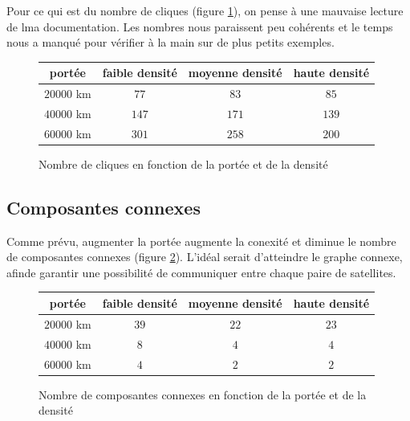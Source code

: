 \documentclass[french]{template}
\begin{document}
Pour ce qui est du nombre de cliques (figure \ref{tab:num-cliques}), on pense à une mauvaise lecture de lma documentation. Les nombres nous paraissent peu cohérents et le temps nous a manqué pour vérifier à la main sur de plus petits exemples.

\begin{figure}[ht]
    \centering
    \begin{tabular}{|c|c|c|c|}
        \hline
        portée      & faible densité & moyenne densité & haute densité \\
        \hline\hline
        $20 000$ km & $77$           & $83$            & $85$          \\
        \hline
        $40 000$ km & $147$          & $171$           & $139$         \\
        \hline
        $60 000$ km & $301$          & $258$           & $200$         \\
        \hline
    \end{tabular}
    \caption{Nombre de cliques en fonction de la portée et de la densité}
    \label{tab:num-cliques}
\end{figure}

\subsection{Composantes connexes}

Comme prévu, augmenter la portée augmente la conexité et diminue le nombre de composantes connexes (figure \ref{tab:num-connected-components}). L'idéal serait d'atteindre le graphe connexe, afinde garantir une possibilité de communiquer entre chaque paire de satellites.

\begin{figure}[ht]
    \centering
    \begin{tabular}{|c|c|c|c|}
        \hline
        portée      & faible densité & moyenne densité & haute densité \\
        \hline\hline
        $20 000$ km & $39$           & $22$            & $23$          \\
        \hline
        $40 000$ km & $8$            & $4$             & $4$           \\
        \hline
        $60 000$ km & $4$            & $2$             & $2$           \\
        \hline
    \end{tabular}
    \caption{Nombre de composantes connexes en fonction de la portée et de la densité}
    \label{tab:num-connected-components}
\end{figure}
\end{document}
